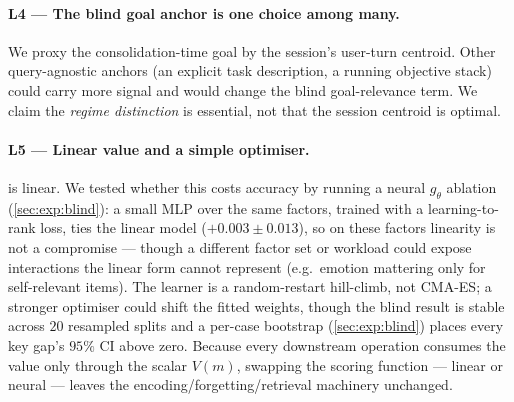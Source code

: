 \paragraph{L4 --- The blind goal anchor is one choice among many.}
We proxy the consolidation-time goal by the session's user-turn centroid.
Other query-agnostic anchors (an explicit task description, a running
objective stack) could carry more signal and would change the blind
goal-relevance term. We claim the \emph{regime distinction} is essential,
not that the session centroid is optimal.

\paragraph{L5 --- Linear value and a simple optimiser.}
 is linear. We tested whether this costs accuracy by
running a neural $g_\theta$ ablation (\cref{sec:exp:blind}): a small MLP
over the same factors, trained with a learning-to-rank loss, ties the
linear model ($+0.003\pm0.013$), so on these factors linearity is not a
compromise --- though a different factor set or workload could expose
interactions the linear form cannot represent (e.g.\ emotion mattering
only for self-relevant items). The learner is a random-restart hill-climb,
not CMA-ES; a stronger optimiser could shift the fitted weights, though
the blind result is stable across $20$ resampled splits and a per-case
bootstrap (\cref{sec:exp:blind}) places every key gap's $95\%$ CI above
zero. Because every downstream operation consumes the value only through
the scalar $V(m)$, swapping the scoring function --- linear or neural ---
leaves the encoding/forgetting/retrieval machinery unchanged.
